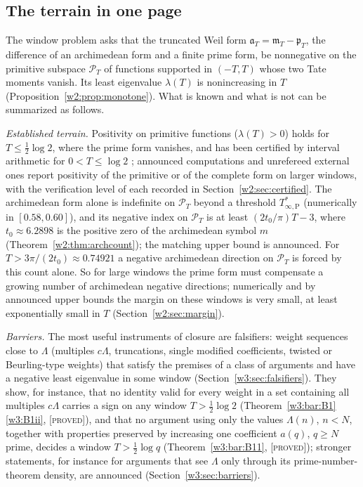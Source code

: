 \documentclass[11pt]{amsart}
\theoremstyle{definition}
\theoremstyle{remark}
\numberwithin{equation}{section}
\newcommand{\PT}{\mathcal{P}_T}                        %
\newcommand{\mT}{\mathfrak{m}_T}                       %
\newcommand{\pT}{\mathfrak{p}_T}                       %
\newcommand{\aT}{\mathfrak{a}_T}                       %
\newcommand{\lam}{\lambda(T)}                          %
\newcommand{\Tarch}{T^{*}_{\infty,\mathrm P}}          %
\newcommand{\stag}[1]{\textsc{[#1]}}
\newcommand{\PROVED}{\stag{proved}}
\begin{document}
\subsection{The terrain in one page}\label{ed:subsec:overview}
The window problem asks that the truncated Weil form $\aT=\mT-\pT$, the
difference of an archimedean form and a finite prime form, be nonnegative on
the primitive subspace $\PT$ of functions supported in $(-T,T)$ whose two Tate
moments vanish. Its least eigenvalue $\lam$ is nonincreasing in $T$
(Proposition~\ref{w2:prop:monotone}). What is known and what is not can be
summarized as follows.

\emph{Established terrain.} Positivity on primitive functions ($\lam>0$) holds for $T\le\frac12\log2$, where the
prime form vanishes, and has been certified by interval arithmetic for
$0<T\le\log2$ \cite[Theorem~9.18 and Corollary~9.20]{P42}; announced computations and unrefereed external ones report positivity of the primitive or of the complete form on larger windows, with the verification level of each recorded in Section~\ref{w2:sec:certified}. The archimedean form alone is
indefinite on $\PT$ beyond a threshold $\Tarch$ (numerically in
$[0.58,0.60]$), and its negative index on $\PT$ is at least $(2t_0/\pi)T-3$, where
$t_0\approx6.2898$ is the positive zero of the archimedean symbol $m$
(Theorem~\ref{w2:thm:archcount}); the matching upper bound is announced. For $T>3\pi/(2t_0)\approx0.74921$
a negative archimedean direction on $\PT$ is forced by this count alone. So for
large windows the prime form must compensate a growing number of archimedean
negative directions; numerically and by announced upper bounds the margin on these windows is very small, at least exponentially small in $T$
(Section~\ref{w2:sec:margin}).

\emph{Barriers.} The most useful instruments of closure are falsifiers:
weight sequences close to $\Lambda$ (multiples $c\Lambda$, truncations, single
modified coefficients, twisted or Beurling-type weights) that satisfy the
premises of a class of arguments and have a negative least eigenvalue in some
window (Section~\ref{w3:sec:falsifiers}). They show, for instance, that no
identity valid for every weight in a set containing all multiples $c\Lambda$
carries a sign on any window $T>\frac12\log2$
(Theorem~\ref{w3:bar:B1}\ref{w3:B1ii}, \PROVED), and that no argument using
only the values $\Lambda(n)$, $n<N$, together with properties preserved by
increasing one coefficient $a(q)$, $q\ge N$ prime, decides a window
$T>\frac12\log q$ (Theorem~\ref{w3:bar:B11}, \PROVED); stronger statements,
for instance for arguments that see $\Lambda$ only through its
prime-number-theorem density, are announced (Section~\ref{w3:sec:barriers}).
\end{document}
